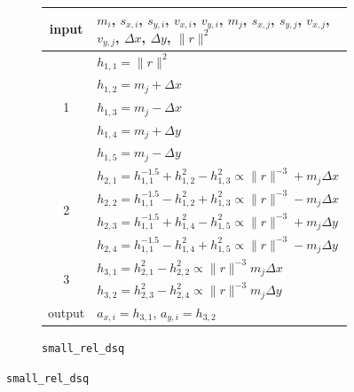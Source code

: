 \documentclass{article}
\begin{document}
\begin{figure}[H]
\begin{subfigure}{\textwidth}
\centering
\begin{tabular}{c|l}
input & $m_{i}$, $s_{x,i}$, $s_{y,i}$, $v_{x,i}$, $v_{y,i}$, $m_{j}$, $s_{x,j}$, $s_{y,j}$, $v_{x,j}$, $v_{y,j}$, $\Delta x$, $\Delta y$, $\|r\|^{2}$ \\
\hline
\multirow{5}{*}{1} & $h_{1,1} = \|r\|^{2}$ \\
& $h_{1,2} = m_{j} + \Delta x$ \\
& $h_{1,3} = m_{j} - \Delta x$ \\
& $h_{1,4} = m_{j} + \Delta y$ \\
& $h_{1,5} = m_{j} - \Delta y$ \\
\hline
\multirow{4}{*}{2} & $h_{2, 1} = h_{1,1}^{-1.5} + h_{1,2}^{2} - h_{1,3}^{2} \propto \|r\|^{-3} + m_{j} \Delta x$ \\
& $h_{2, 2} = h_{1,1}^{-1.5} - h_{1,2}^{2} + h_{1,3}^{2} \propto \|r\|^{-3} - m_{j} \Delta x$ \\
& $h_{2, 3} = h_{1,1}^{-1.5} + h_{1,4}^{2} - h_{1,5}^{2} \propto \|r\|^{-3} + m_{j} \Delta y$ \\
& $h_{2, 4} = h_{1,1}^{-1.5} - h_{1,4}^{2} + h_{1,5}^{2} \propto \|r\|^{-3} - m_{j} \Delta y$ \\
\hline
\multirow{2}{*}{3} & $h_{3,1} = h_{2,1}^{2} - h_{2,2}^{2} \propto \|r\|^{-3} m_{j} \Delta x$ \\
& $h_{3,2} = h_{2,3}^{2} - h_{2,4}^{2} \propto \|r\|^{-3} m_{j} \Delta y$ \\
\hline
output & $a_{x,i} = h_{3,1}$, $a_{y,i} = h_{3,2}$ \\
\end{tabular}
\caption{\texttt{small\_rel\_dsq}}
\label{fig:feasible-route-small-rel-dsq}
\end{subfigure}



\end{figure}
\end{document}
